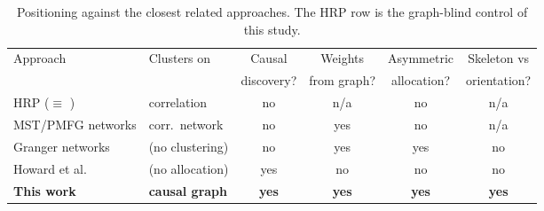 \begin{table}[t]
  \centering
  \small
  \caption{Positioning against the closest related approaches. The HRP row is
  the graph-blind \HRP{} control of this study.}
  \label{tab:gap}
  \begin{tabular}{l l c c c c}
    \toprule
    Approach & Clusters on & Causal & Weights & Asymmetric & Skeleton vs \\
             &             & discovery? & from graph? & allocation? & orientation? \\
    \midrule
    HRP \cite{lopezdeprado2016hrp} ($\equiv$ \HRP{}) & correlation & no & n/a & no & n/a \\
    MST/PMFG networks \cite{pozzi2013spread,peralta2016network} & corr.\ network & no & yes & no & n/a \\
    Granger networks \cite{vyrost2019network} & (no clustering) & no & yes & yes & no \\
    Howard et al.\ \cite{howard2025causal} & (no allocation)  & yes & no  & no & no \\
    \textbf{This work}                     & \textbf{causal graph} & \textbf{yes} & \textbf{yes} & \textbf{yes} & \textbf{yes} \\
    \bottomrule
  \end{tabular}
\end{table}
